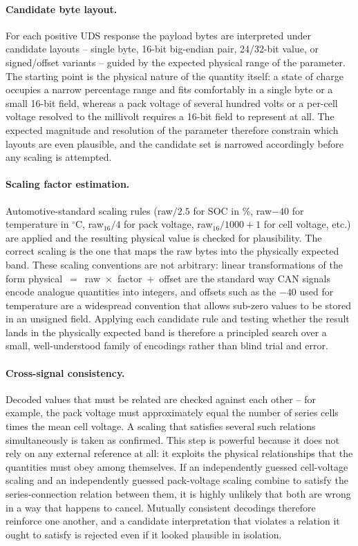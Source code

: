 \documentclass[11pt,a4paper,oneside,parskip=half]{scrreprt}
\begin{document}
\paragraph{Candidate byte layout.} For each positive UDS response the payload bytes are interpreted under candidate layouts -- single byte, 16-bit big-endian pair, 24/32-bit value, or signed/offset variants -- guided by the expected physical range of the parameter. The starting point is the physical nature of the quantity itself: a state of charge occupies a narrow percentage range and fits comfortably in a single byte or a small 16-bit field, whereas a pack voltage of several hundred volts or a per-cell voltage resolved to the millivolt requires a 16-bit field to represent at all. The expected magnitude and resolution of the parameter therefore constrain which layouts are even plausible, and the candidate set is narrowed accordingly before any scaling is attempted.

\paragraph{Scaling factor estimation.} Automotive-standard scaling rules (raw$/2.5$ for SOC in \%, raw$-40$ for temperature in $^\circ$C, raw$_{16}/4$ for pack voltage, raw$_{16}/1000+1$ for cell voltage, etc.) are applied and the resulting physical value is checked for plausibility. The correct scaling is the one that maps the raw bytes into the physically expected band. These scaling conventions are not arbitrary: linear transformations of the form physical~$=$~raw~$\times$~factor~$+$~offset are the standard way CAN signals encode analogue quantities into integers, and offsets such as the $-40$ used for temperature are a widespread convention that allows sub-zero values to be stored in an unsigned field. Applying each candidate rule and testing whether the result lands in the physically expected band is therefore a principled search over a small, well-understood family of encodings rather than blind trial and error.

\paragraph{Cross-signal consistency.} Decoded values that must be related are checked against each other -- for example, the pack voltage must approximately equal the number of series cells times the mean cell voltage. A scaling that satisfies several such relations simultaneously is taken as confirmed. This step is powerful because it does not rely on any external reference at all: it exploits the physical relationships that the quantities must obey among themselves. If an independently guessed cell-voltage scaling and an independently guessed pack-voltage scaling combine to satisfy the series-connection relation between them, it is highly unlikely that both are wrong in a way that happens to cancel. Mutually consistent decodings therefore reinforce one another, and a candidate interpretation that violates a relation it ought to satisfy is rejected even if it looked plausible in isolation.
\end{document}
